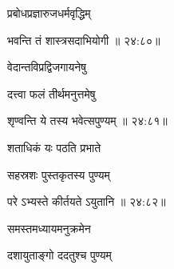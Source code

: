 {\devanagarifont प्रबोधप्रज्ञारुजधर्मवृद्धिम् }%
  \dontdisplaylinenum    {}%



\nemslokad

{\devanagarifont भवन्ति तं शास्त्रसदाभियोगी {॥ २४:८०॥} \veg\dontdisplaylinenum }%

\ujvers{}

\nemslokab

{\devanagarifont वेदान्तविप्रद्विजगायनेषु  \danda\dontdisplaylinenum }%
 
\nemslokac

{\devanagarifont दत्त्वा फलं तीर्थमनुत्तमेषु }%
  \dontdisplaylinenum    {}%



\nemslokad

{\devanagarifont शृण्वन्ति ये तस्य भवेत्सपुण्यम् {॥ २४:८१॥} \veg\dontdisplaylinenum }%
 
\ujvers{}    %


\nemslokab

{\devanagarifont शताधिकं यः पठति प्रभाते  \danda\dontdisplaylinenum }%
 
\nemslokac

{\devanagarifont सहस्रशः पुस्तकृतस्य पुण्यम् }%
  \dontdisplaylinenum


\nemslokad

{\devanagarifont परे ऽभ्यस्ते कीर्तयते ऽयुतानि {॥ २४:८२॥} \veg\dontdisplaylinenum }%

\ujvers{}

\nemslokab

{\devanagarifont समस्तमध्यायमनुक्रमेन  \danda\dontdisplaylinenum }%
 
\nemslokac

{\devanagarifont दशायुताङ्गो ददतुश्च पुण्यम् }%
  \dontdisplaylinenum    {}%

